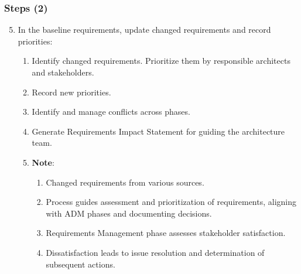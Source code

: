 \documentclass[aspectratio=169, table]{beamer}
\begin{document}
	\begin{frame}
		\frametitle{Steps (2)}
		\vspace{20pt}
		\begin{enumerate}
			\setcounter{enumi}{4}
			\item In the baseline requirements, update changed requirements and record priorities:
			\begin{enumerate}
				\item Identify changed requirements. Prioritize them by responsible architects and stakeholders.
				\item Record new priorities.
				\item Identify and manage conflicts across phases.
				\item Generate Requirements Impact Statement for guiding the architecture team.
				\item \textbf{Note}:
				\begin{enumerate}
					\item Changed requirements from various sources.
					\item Process guides assessment and prioritization of requirements, aligning with ADM phases and documenting decisions.
					\item Requirements Management phase assesses stakeholder satisfaction.
					\item Dissatisfaction leads to issue resolution and determination of subsequent actions.
				\end{enumerate}
			\end{enumerate}
		\end{enumerate}
	\end{frame}
	
\end{document}
